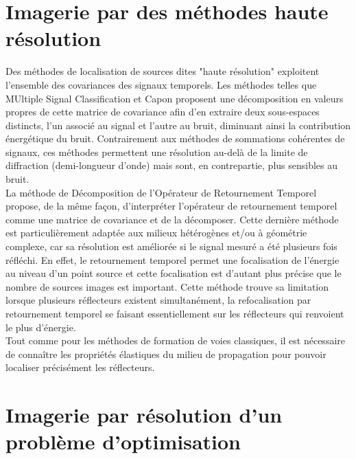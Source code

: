 \section{Imagerie par des méthodes haute résolution}


Des méthodes de localisation de sources dites "haute résolution" exploitent l'ensemble des covariances des signaux temporels. Les méthodes telles que MUltiple Signal Classification \citep{schmidt} et Capon \citep{capon} proposent une décomposition en valeurs propres de cette matrice de covariance afin d'en extraire deux sous-espaces distincts, l'un associé au signal et l'autre au bruit, diminuant ainsi la contribution énergétique du bruit. Contrairement aux méthodes de sommations cohérentes de signaux, ces méthodes permettent une résolution au-delà de la limite de diffraction (demi-longueur d’onde) mais sont, en contrepartie, plus sensibles au bruit.\\

La méthode de Décomposition de l'Opérateur de Retournement Temporel \citep{prada_dort} propose, de la même façon, d'interpréter l'opérateur de retournement temporel comme une matrice de covariance et de la décomposer. Cette dernière méthode est particulièrement adaptée aux milieux hétérogènes et/ou à géométrie complexe, car sa résolution est améliorée si le signal mesuré a été plusieurs fois réfléchi. En effet, le retournement temporel permet une focalisation de l'énergie au niveau d'un point source et cette focalisation est d'autant plus précise que le nombre de sources images est important. Cette méthode trouve sa limitation lorsque plusieurs réflecteurs existent simultanément, la refocalisation par retournement temporel se faisant essentiellement sur les réflecteurs qui renvoient le plus d’énergie. \\
  

Tout comme pour les méthodes de formation de voies classiques, il est nécessaire de connaître les propriétés élastiques du milieu de propagation pour pouvoir localiser précisément les réflecteurs.\\


\section{Imagerie par résolution d'un problème d'optimisation}

